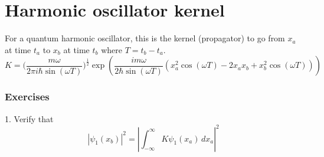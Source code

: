 

\section*{Harmonic oscillator kernel}

For a quantum harmonic oscillator, this is the kernel (propagator) to go from $x_a$ at time $t_a$
to $x_b$ at time $t_b$ where $T=t_b-t_a$.
\begin{equation*}
K=\biggl(\frac{m\omega}{2\pi i\hbar\sin(\omega T)}\biggr)^\frac{1}{2}
\exp\left(\frac{im\omega}{2\hbar\sin(\omega T)}
\left(
x_a^2\cos(\omega T)-2x_ax_b+x_b^2\cos(\omega T)
\right)
\right)
\end{equation*}

\subsubsection*{Exercises}

1. Verify that
\begin{equation*}
\left|\psi_1(x_b)\right|^2=\left|\int_{-\infty}^\infty K\psi_1(x_a)\,dx_a\right|^2
\end{equation*}


